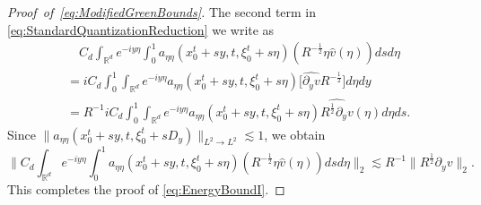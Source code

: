 \documentclass{amsart}
\theoremstyle{definition}
\newcommand{\R}{\mathbb{R}}
\begin{document}
\begin{proof}[Proof~of~\eqref{eq:ModifiedGreenBounds}]
The second term in \eqref{eq:StandardQuantizationReduction} we write as
\begin{equation*}
\begin{split}
&\quad C_d \int_{\R^d} e^{-i y \eta} \int_0^1 a_{\eta \eta}(x_0^t + s y,t, \xi_0^t + s \eta) (R^{-\frac{1}{2}} \eta \hat{v}(\eta)) ds d\eta \\
&= i C_d \int_0^1 \int_{\R^d} e^{-i y \eta} a_{\eta \eta}(x_0^t +sy,t, \xi_0^t + s \eta) \big[ \widehat{\partial_y v} R^{-\frac{1}{2}} \big] d\eta dy \\
&= R^{-1} i C_d \int_0^1 \int_{\R^d} e^{-i y \eta} a_{\eta \eta}(x_0^t + sy, t, \xi_0^t+s\eta) \widehat{R^{\frac{1}{2}} \partial_y v}(\eta) d\eta ds.
\end{split}
\end{equation*}
Since $\| a_{\eta \eta}(x_0^t + s y ,t, \xi_0^t + s D_y) \|_{L^2 \to L^2} \lesssim 1$, we obtain
\begin{equation*}
\| C_d \int_{\R^d} e^{-i y \eta} \int_0^1 a_{\eta \eta}(x_0^t + s y,t, \xi_0^t + s \eta) (R^{-\frac{1}{2}} \eta \hat{v}(\eta)) ds d\eta \|_2 \lesssim R^{-1} \| R^{\frac{1}{2}} \partial_y v \|_2.
\end{equation*}
This completes the proof of \eqref{eq:EnergyBoundI}.


\end{proof}
\end{document}
